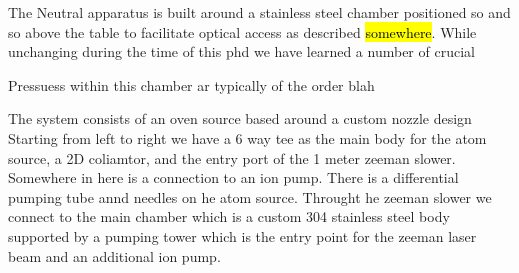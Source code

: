 The Neutral apparatus is built around a stainless steel chamber positioned so and so above the table to facilitate optical access as described \hl{somewhere}. While unchanging during the time of this phd we have learned a number of crucial 

Pressuess within this chamber ar typically of the order blah

The system consists of an oven source based around a custom nozzle design
Starting from left to right we have a 6 way tee as the main body for the atom source, a 2D coliamtor, and the entry port of the 1 meter zeeman slower. Somewhere in here is a connection to an ion pump.
There is a differential pumping tube annd needles on he atom source. Throught he zeeman slower we connect to the main chamber which is a custom 304 stainless steel body supported by a pumping tower which is the entry point for the zeeman laser beam and an additional ion pump. 

